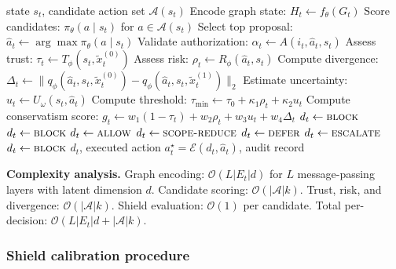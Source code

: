 \documentclass[10pt,journal,compsoc]{IEEEtran}
\begin{document}
\begin{algorithm}[t]
\caption{CASTER-ZT bounded autonomous recovery decision}
\label{alg:casterzt}
\begin{algorithmic}[1]
\Require state $s_t$, candidate action set $\mathcal{A}(s_t)$
\State Encode graph state: $H_t \gets f_\theta(G_t)$ 
\State Score candidates: $\pi_\theta(a \mid s_t)$ for $a \in \mathcal{A}(s_t)$ 
\State Select top proposal: $\hat a_t \gets \arg\max \pi_\theta(a \mid s_t)$
\State Validate authorization: $\alpha_t \gets A(i_t,\hat a_t,s_t)$ 
\State Assess trust: $\tau_t \gets T_\phi(s_t, \tilde{x}_t^{(0)})$ 
\State Assess risk: $\rho_t \gets R_\phi(\hat a_t, s_t)$ 
\State Compute divergence: $\Delta_t \gets \| q_\phi(\hat a_t,s_t,\tilde{x}_t^{(0)}) - q_\phi(\hat a_t,s_t,\tilde{x}_t^{(1)}) \|_2$ 
\State Estimate uncertainty: $u_t \gets U_\omega(s_t,\hat a_t)$ 
\State Compute threshold: $\tau_{\min} \gets \tau_0 + \kappa_1\rho_t + \kappa_2 u_t$
\State Compute conservatism score: $g_t \gets w_1(1-\tau_t)+w_2\rho_t+w_3 u_t+w_4\Delta_t$
    \State $d_t \gets \textsc{block}$
    \State $d_t \gets \textsc{block}$
    \State $d_t \gets \textsc{allow}$
    \State $d_t \gets \textsc{scope-reduce}$
    \State $d_t \gets \textsc{defer}$
    \State $d_t \gets \textsc{escalate}$
\Else
    \State $d_t \gets \textsc{block}$
\EndIf
\State \Return $d_t$, executed action $a_t^\star = \mathcal{E}(d_t,\hat a_t)$, audit record
\end{algorithmic}
\end{algorithm}

\noindent\textbf{Complexity analysis.}
Graph encoding: $\mathcal{O}(L|E_t|d)$ for $L$ message-passing layers with latent dimension $d$.
Candidate scoring: $\mathcal{O}(|\mathcal{A}|k)$.
Trust, risk, and divergence: $\mathcal{O}(|\mathcal{A}|k)$.
Shield evaluation: $\mathcal{O}(1)$ per candidate.
Total per-decision: $\mathcal{O}(L|E_t|d + |\mathcal{A}|k)$.

\subsubsection{Shield calibration procedure}
\end{document}
